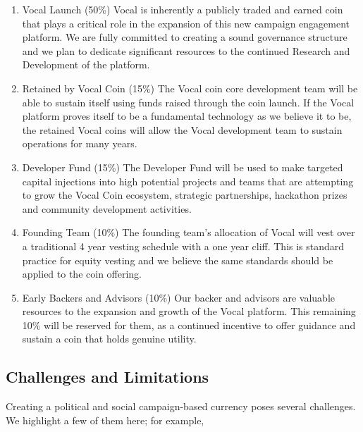\documentclass[conference]{IEEEtran}
\begin{document}
    \begin{enumerate}
    \item Vocal Launch (50\%)
   Vocal is inherently a publicly traded and earned coin that plays a critical role in the expansion of this new campaign engagement platform. We are fully committed to creating a sound governance structure and we plan to dedicate significant resources to the continued Research and Development of the platform.
    \item Retained by Vocal Coin (15\%)
    The Vocal coin core development team will be able to sustain itself using funds raised through the coin launch. If the Vocal platform proves itself to be a fundamental technology as we believe it to be, the retained Vocal coins will allow the Vocal development team to sustain operations for many years.
    \item Developer Fund (15\%)
    The Developer Fund will be used to make targeted capital injections into high potential projects and teams that are attempting to grow the Vocal Coin ecosystem, strategic partnerships, hackathon prizes and community development activities.
    \item Founding Team (10\%)
    The founding team’s allocation of Vocal will vest over a traditional 4 year vesting schedule with a one year cliff. This is standard practice for equity vesting and we believe the same standards should be applied to the coin offering. 
    \item Early Backers and Advisors (10\%)
    Our backer and advisors are valuable resources to the expansion and growth of the Vocal platform. This remaining 10\% will be reserved for them, as a continued incentive to offer guidance and sustain a coin that holds genuine utility.
    \end{enumerate}
    


    \subsection{Challenges and Limitations}
    Creating a political and social campaign-based currency poses several challenges. We highlight a few of them here; for example,
\end{document}
